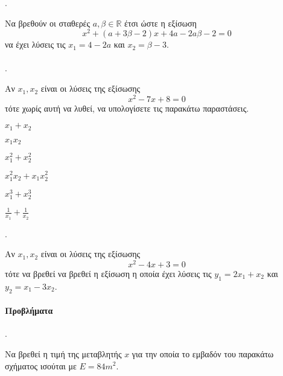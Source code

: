 \documentclass[11pt,a4paper,twocolumn]{article}
\newcounter{askhsh}
\newcommand{\askhsh}{{\large\theaskhsh.}\ \addtocounter{askhsh}{1}}
\begin{document}
\askhsh
Να βρεθούν οι σταθερές $ a, \beta\in\mathbb{R} $ έτσι ώστε η εξίσωση
 \[ x^2+(a+3\beta-2)x+4a-2a\beta-2=0 \]
να έχει λύσεις τις $ x_1=4-2a $ και $ x_2=\beta-3 $.\\\\
\askhsh
Αν $ x_1,x_2 $ είναι οι λύσεις της εξίσωσης
\[ x^2-7x+8=0 \]
τότε χωρίς αυτή να λυθεί, να υπολογίσετε τις παρακάτω παραστάσεις.
\begin{multicols}{2}
\begin{alist}
\item $ x_1+x_2 $
\item $ x_1x_2 $
\item $ x_1^2+x_2^2 $
\item $ x_1^2x_2+x_1x_2^2 $
\item $ x_1^3+x_2^3 $
\item $ \frac{1}{x_1}+\frac{1}{x_2} $
\end{alist}
\end{multicols}
\askhsh
Αν $ x_1,x_2 $ είναι οι λύσεις της εξίσωσης \[ x^2-4x+3=0 \] τότε να βρεθεί να βρεθεί η εξίσωση η οποία έχει λύσεις τις $ y_1=2x_1+x_2 $ και $ y_2=x_1-3x_2 $.
\paragraph{Προβλήματα}
\askhsh
Να βρεθεί η τιμή της μεταβλητής $ x $ για την οποία το εμβαδόν του παρακάτω σχήματος ισούται με $ E=84m^2 $.
\begin{center}
\end{center}
\end{document}
